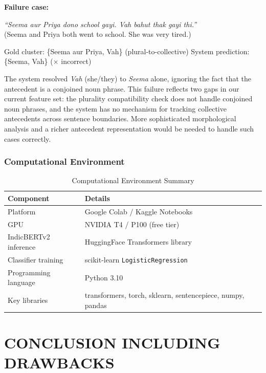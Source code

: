 \documentclass[12pt,a4paper]{report}
\begin{document}
\vspace{0.5em}
\textbf{Failure case:}

\begin{center}
\textit{``Seema aur Priya dono school gayi. Vah bahut thak gayi thi.''}\\
(Seema and Priya both went to school. She was very tired.)
\end{center}

\noindent Gold cluster: \{Seema aur Priya, Vah\} (plural-to-collective) \quad System prediction: \{Seema, Vah\} ($\times$ incorrect)

\noindent The system resolved \textit{Vah} (she/they) to \textit{Seema} alone, ignoring the fact that the antecedent is a conjoined noun phrase. This failure reflects two gaps in our current feature set: the plurality compatibility check does not handle conjoined noun phrases, and the system has no mechanism for tracking collective antecedents across sentence boundaries. More sophisticated morphological analysis and a richer antecedent representation would be needed to handle such cases correctly.

\subsection{Computational Environment}

\begin{table}[H]
\centering
\caption{Computational Environment Summary}
\begin{tabular}{|l|l|}
\hline
\textbf{Component} & \textbf{Details} \\
\hline
Platform & Google Colab / Kaggle Notebooks \\
GPU & NVIDIA T4 / P100 (free tier) \\
IndicBERTv2 inference & HuggingFace Transformers library \cite{wolf2020transformers} \\
Classifier training & scikit-learn \texttt{LogisticRegression} \\
Programming language & Python 3.10 \\
Key libraries & transformers, torch, sklearn, sentencepiece, numpy, pandas \\
\hline
\end{tabular}
\end{table}


\chapter{CONCLUSION INCLUDING DRAWBACKS}
\end{document}
